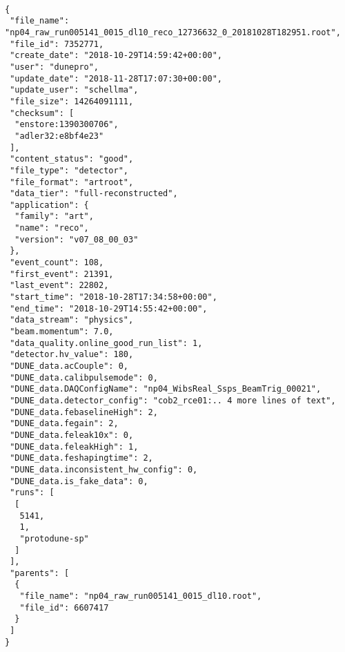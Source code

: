 \begin{verbatim}

{
 "file_name": "np04_raw_run005141_0015_dl10_reco_12736632_0_20181028T182951.root", 
 "file_id": 7352771, 
 "create_date": "2018-10-29T14:59:42+00:00", 
 "user": "dunepro", 
 "update_date": "2018-11-28T17:07:30+00:00", 
 "update_user": "schellma", 
 "file_size": 14264091111, 
 "checksum": [
  "enstore:1390300706", 
  "adler32:e8bf4e23"
 ], 
 "content_status": "good", 
 "file_type": "detector", 
 "file_format": "artroot", 
 "data_tier": "full-reconstructed", 
 "application": {
  "family": "art", 
  "name": "reco", 
  "version": "v07_08_00_03"
 }, 
 "event_count": 108, 
 "first_event": 21391, 
 "last_event": 22802, 
 "start_time": "2018-10-28T17:34:58+00:00", 
 "end_time": "2018-10-29T14:55:42+00:00", 
 "data_stream": "physics", 
 "beam.momentum": 7.0, 
 "data_quality.online_good_run_list": 1, 
 "detector.hv_value": 180, 
 "DUNE_data.acCouple": 0, 
 "DUNE_data.calibpulsemode": 0, 
 "DUNE_data.DAQConfigName": "np04_WibsReal_Ssps_BeamTrig_00021", 
 "DUNE_data.detector_config": "cob2_rce01:.. 4 more lines of text", 
 "DUNE_data.febaselineHigh": 2, 
 "DUNE_data.fegain": 2, 
 "DUNE_data.feleak10x": 0, 
 "DUNE_data.feleakHigh": 1, 
 "DUNE_data.feshapingtime": 2, 
 "DUNE_data.inconsistent_hw_config": 0, 
 "DUNE_data.is_fake_data": 0, 
 "runs": [
  [
   5141, 
   1, 
   "protodune-sp"
  ]
 ], 
 "parents": [
  {
   "file_name": "np04_raw_run005141_0015_dl10.root", 
   "file_id": 6607417
  }
 ]
}



\end{verbatim}








